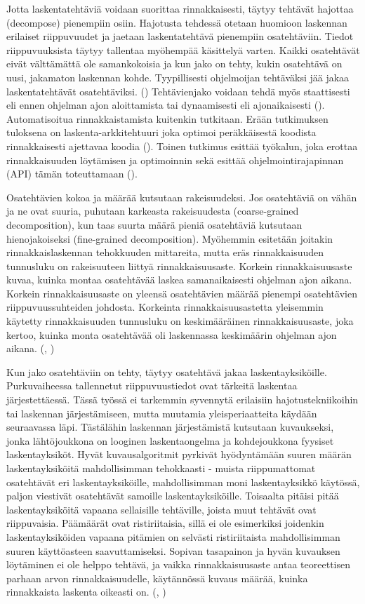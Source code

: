 Jotta laskentatehtäviä voidaan suorittaa rinnakkaisesti, täytyy tehtävät
hajottaa (decompose) pienempiin osiin. Hajotusta tehdessä otetaan huomioon laskennan
erilaiset riippuvuudet ja jaetaan laskentatehtävä pienempiin osatehtäviin.
Tiedot riippuvuuksista täytyy tallentaa myöhempää käsittelyä varten.
Kaikki osatehtävät eivät välttämättä ole samankokoisia ja kun jako on tehty,
kukin osatehtävä on uusi, jakamaton laskennan kohde. Tyypillisesti ohjelmoijan
tehtäväksi jää jakaa laskentatehtävät osatehtäviksi. (\citealt{intro})
Tehtävienjako voidaan tehdä myös staattisesti eli ennen ohjelman ajon
aloittamista tai dynaamisesti eli ajonaikaisesti (\citealt{rauber}).
Automatisoitua rinnakkaistamista kuitenkin tutkitaan. Erään tutkimuksen
tuloksena on laskenta-arkkitehtuuri joka optimoi peräkkäisestä koodista
rinnakkaisesti ajettavaa koodia (\citealt{apopei}). Toinen tutkimus esittää
työkalun, joka erottaa rinnakkaisuuden löytämisen ja optimoinnin sekä esittää
ohjelmointirajapinnan (API) tämän toteuttamaan (\citealt{dope}).

Osatehtävien kokoa ja määrää kutsutaan rakeisuudeksi. Jos osatehtäviä on vähän
ja ne ovat suuria, puhutaan karkeasta rakeisuudesta (coarse-grained
decomposition), kun taas suurta määrä pieniä osatehtäviä kutsutaan
hienojakoiseksi (fine-grained decomposition). Myöhemmin esitetään joitakin
rinnakkaislaskennan tehokkuuden mittareita, mutta eräs rinnakkaisuuden
tunnusluku on rakeisuuteen liittyä rinnakkaisuusaste. Korkein 
rinnakkaisuusaste kuvaa, kuinka montaa osatehtävää laskea samanaikaisesti
ohjelman ajon aikana. Korkein rinnakkaisuusaste on yleensä osatehtävien määrää
pienempi osatehtävien riippuvuussuhteiden johdosta. Korkeinta
rinnakkaisuusastetta yleisemmin käytetty rinnakkaisuuden tunnusluku on
keskimääräinen rinnakkaisuusaste, joka kertoo, kuinka monta osatehtävää oli
laskennassa keskimäärin ohjelman ajon aikana. (\citealt{intro}, \citealt{rauber})

Kun jako osatehtäviin on tehty, täytyy osatehtävä jakaa laskentayksiköille.
Purkuvaiheessa tallennetut riippuvuustiedot ovat tärkeitä laskentaa
järjestettäessä. Tässä työssä ei tarkemmin syvennytä erilaisiin
hajotustekniikoihin tai laskennan järjestämiseen, mutta muutamia
yleisperiaatteita käydään seuraavassa läpi. Tästälähin laskennan järjestämistä
kutsutaan kuvaukseksi, jonka lähtöjoukkona on looginen laskentaongelma ja kohdejoukkona fyysiset laskentayksiköt.
Hyvät kuvausalgoritmit pyrkivät hyödyntämään suuren määrän laskentayksiköitä
mahdollisimman tehokkaasti - muista riippumattomat osatehtävät eri
laskentayksiköille, mahdollisimman moni laskentayksikkö käytössä,
paljon viestivät osatehtävät samoille laskentayksiköille.
Toisaalta pitäisi pitää laskentayksiköitä vapaana sellaisille tehtäville,
joista muut tehtävät ovat riippuvaisia. Päämäärät ovat ristiriitaisia, sillä
ei ole esimerkiksi joidenkin laskentayksiköiden vapaana pitämien on selvästi
ristiriitaista mahdollisimman suuren käyttöasteen saavuttamiseksi. Sopivan
tasapainon ja hyvän kuvauksen löytäminen ei ole helppo tehtävä, ja vaikka
rinnakkaisuusaste antaa teoreettisen parhaan arvon rinnakkaisuudelle,
käytännössä kuvaus määrää, kuinka rinnakkaista laskenta oikeasti on.
(\citealt{intro}, \citealt{rauber})


